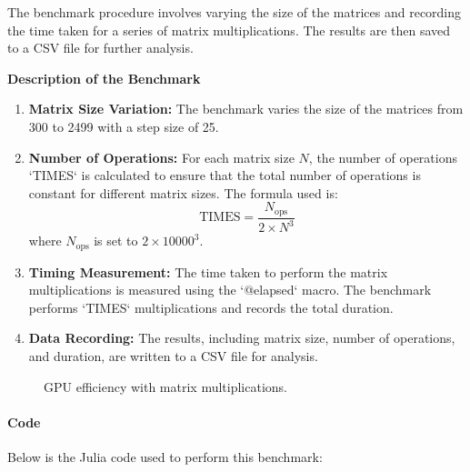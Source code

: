 The benchmark procedure involves varying the size of the matrices and recording the time taken for a series of matrix multiplications. The results are then saved to a CSV file for further analysis.

\begin{center}
   \textbf{Description of the Benchmark}   
\end{center}

\begin{enumerate}
   \item \textbf{Matrix Size Variation:} The benchmark varies the size of the matrices from 300 to 2499 with a step size of 25.
   \item \textbf{Number of Operations:} For each matrix size \(N\), the number of operations `TIMES` is calculated to ensure that the total number of operations is constant for different matrix sizes. The formula used is:
   \[
   \text{TIMES} = \frac{N_{\text{ops}}}{2 \times N^3}
   \]
 where \(N_{\text{ops}}\) is set to \(2 \times 10000^3\).
   \item \textbf{Timing Measurement:} The time taken to perform the matrix multiplications is measured using the `@elapsed` macro. The benchmark performs `TIMES` multiplications and records the total duration.
   \item \textbf{Data Recording:} The results, including matrix size, number of operations, and duration, are written to a CSV file for analysis.
\end{enumerate}

\begin{figure}[h]
   \begin{center}
       
  \end{center}
  \caption{GPU efficiency with matrix multiplications.}
  \label{}
\end{figure}
\newpage

\paragraph{Code}

Below is the Julia code used to perform this benchmark:

\begin{comment}

\end{comment}

